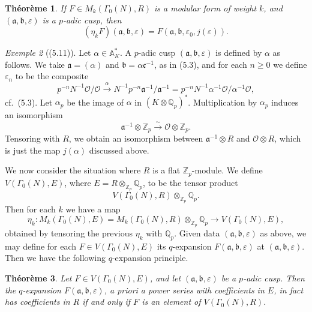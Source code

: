 \documentclass[12pt,a4paper]{article}
\theoremstyle{plain}
\newtheorem{theorem}{Th\'{e}or\`{e}me}[section]
\theoremstyle{definition}
\theoremstyle{remark}
\newtheorem{example}[theorem]{Exemple}
\newenvironment{namedtheorem}[1][]{%
  \renewcommand{\thetheorem}{#1}%
  \theoremstyle{plain}%
  \begin{theorem}%
}{\end{theorem}\renewcommand{\thetheorem}{\arabic{section}.\arabic{theorem}}}
\begin{document}
\begin{namedtheorem}[(5.10)]
If $F \in M_k(\Gamma_0(N), R)$ is a modular form of weight $k$, and $(\mathfrak{a}, \mathfrak{b}, \varepsilon)$ is a $p$-adic cusp, then
\[
(\eta_k F)(\mathfrak{a}, \mathfrak{b}, \varepsilon) = F(\mathfrak{a}, \mathfrak{b}, \varepsilon_0, j(\varepsilon)).
\]
\end{namedtheorem}

\begin{example}[(5.11)]
Let $\alpha \in \mathbb{A}_K^*$. A $p$-adic cusp $(\mathfrak{a}, \mathfrak{b}, \varepsilon)$ is defined by $\alpha$ as follows. We take $\mathfrak{a} = (\alpha)$ and $\mathfrak{b} = \alpha\mathfrak{c}^{-1}$, as in (5.3), and for each $n \ge 0$ we define $\varepsilon_n$ to be the composite
\[
p^{-n}N^{-1}\mathcal{O}/\mathcal{O} \xrightarrow{\alpha} N^{-1}p^{-n}\mathfrak{a}^{-1}/\mathfrak{a}^{-1} = p^{-n}N^{-1}\alpha^{-1}\mathcal{O}/\alpha^{-1}\mathcal{O},
\]
cf.~(5.3). Let $\alpha_p$ be the image of $\alpha$ in $(K \otimes \mathbb{Q}_p)^*$. Multiplication by $\alpha_p$ induces an isomorphism
\begin{equation}\label{eq:5.12}
\mathfrak{a}^{-1} \otimes \mathbb{Z}_p \xrightarrow{\sim} \mathcal{O} \otimes \mathbb{Z}_p.
\end{equation}
Tensoring with $R$, we obtain an isomorphism between $\mathfrak{a}^{-1} \otimes R$ and $\mathcal{O} \otimes R$, which is just the map $j(\alpha)$ discussed above.
\end{example}

We now consider the situation where $R$ is a flat $\mathbb{Z}_p$-module. We define $V(\Gamma_0(N), E)$, where $E = R \otimes_{\mathbb{Z}_p} \mathbb{Q}_p$, to be the tensor product
\[
V(\Gamma_0(N), R) \otimes_{\mathbb{Z}_p} \mathbb{Q}_p.
\]
Then for each $k$ we have a map
\[
\eta_k: M_k(\Gamma_0(N), E) = M_k(\Gamma_0(N), R) \otimes_{\mathbb{Z}_p} \mathbb{Q}_p \longrightarrow V(\Gamma_0(N), E),
\]
obtained by tensoring the previous $\eta_k$ with $\mathbb{Q}_p$. Given data $(\mathfrak{a}, \mathfrak{b}, \varepsilon)$ as above, we may define for each $F \in V(\Gamma_0(N), E)$ its $q$-expansion $F(\mathfrak{a}, \mathfrak{b}, \varepsilon)$ at $(\mathfrak{a}, \mathfrak{b}, \varepsilon)$. Then we have the following $q$-expansion principle.

\begin{namedtheorem}[(5.13)]
Let $F \in V(\Gamma_0(N), E)$, and let $(\mathfrak{a}, \mathfrak{b}, \varepsilon)$ be a $p$-adic cusp. Then the $q$-expansion $F(\mathfrak{a}, \mathfrak{b}, \varepsilon)$, a priori a power series with coefficients in $E$, in fact has coefficients in $R$ if and only if $F$ is an element of $V(\Gamma_0(N), R)$.
\end{namedtheorem}
\end{document}
